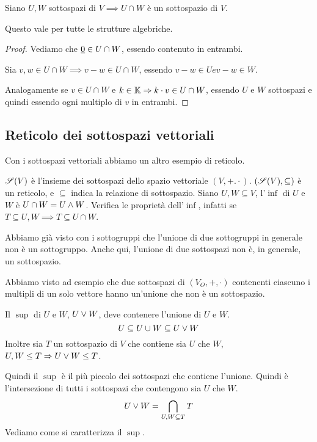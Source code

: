 \begin{prop}
Siano $U, W$ sottospazi di $V \implies U \cap W$ \`e un sottospazio di $V$.
\end{prop}
Questo vale per tutte le strutture algebriche.

\begin{proof}
Vediamo che $\underline{0} \in U \cap W$, essendo contenuto in entrambi.

Sia $v, w \in U \cap W \implies v - w \in U \cap W$, essendo $v - w \in U e v - w \in W$.

Analogamente se $v \in U \cap W$ e $k \in \mathbb{K} \Rightarrow k \cdot v \in U \cap W$, essendo $U$ e $W$ sottospazi e quindi essendo ogni multiplo di $v$ in entrambi.
\end{proof}

\subsection{Reticolo dei sottospazi vettoriali}

Con i sottospazi vettoriali abbiamo un altro esempio di reticolo.

$\mathscr{S}(V)$ \`e l'insieme dei sottospazi dello spazio vettoriale $(V, +. \cdot)$. $(\mathscr{S}(V), \subseteq)$ \`e un reticolo, e $\subseteq$ indica la relazione di sottospazio. Siano $U, W \subseteq V$, l'$\inf$ di $U$ e $W$ \`e $U \cap W = U \wedge W$. Verifica le propriet\`a dell'$\inf$, infatti se $T \subseteq U, W \implies T \subseteq U \cap W$.

Abbiamo gi\`a visto con i sottogruppi che l'unione di due sottogruppi in generale non \`e un sottogruppo. Anche qui, l'unione di due sottospazi non \`e, in generale, un sottospazio.

Abbiamo visto ad esempio che due sottospazi di $(V_O, +, \cdot)$ contenenti ciascuno i multipli di un solo vettore hanno un'unione che non \`e un sottospazio.

Il $\sup$ di $U$ e $W$, $U \vee W$, deve contenere l'unione di $U$ e $W$.
\[
U \subseteq U \cup W \subseteq U \vee W
\]
Inoltre sia $T$ un sottospazio di $V$ che contiene sia $U$ che $W$, $U, W \le T \Rightarrow U \vee W \le T$.

Quindi il $\sup$ \`e il pi\`u piccolo dei sottospazi che contiene l'unione. Quindi \`e l'intersezione di tutti i sottospazi che contengono sia $U$ che $W$.
\[
U \vee W = \bigcap_{U, W \subseteq T} T
\]
Vediamo come si caratterizza il $\sup$.


